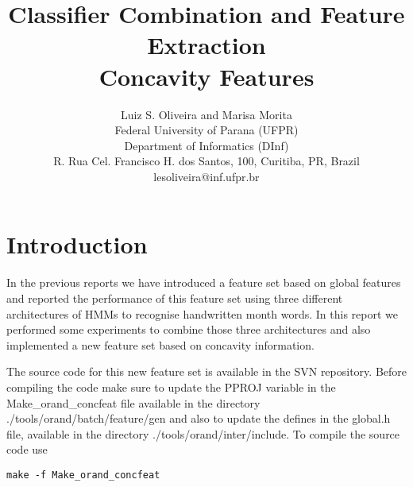 \documentclass{article}[14pt, oneside, a4paper, times]
\begin{document}
\title{Classifier Combination and Feature Extraction 
\\ \large Concavity Features}
\author{Luiz S. Oliveira and Marisa Morita  
\\
\vspace {-10pt}
Federal University of Parana (UFPR)\\
\vspace {-10pt}
Department of Informatics (DInf)\\
\vspace {-10pt}
R. Rua Cel. Francisco H. dos Santos, 100, Curitiba, PR, Brazil \\
lesoliveira@inf.ufpr.br \\ 
}


\date{}
\maketitle
\thispagestyle{empty}





\section{Introduction} 

In the previous reports we have introduced a feature set based on global features and reported the performance of this feature set using three different architectures of HMMs to recognise handwritten month words. In this report we performed some experiments to combine those three architectures and also implemented a new feature set based on concavity information. 

The source code for this new feature set is available in the SVN repository. Before compiling the code make sure to update the \textsf{PPROJ} variable in the \textsf{Make\_orand\_concfeat} file available in the directory \textsf{./tools/orand/batch/feature/gen} and also to update the defines in the \textsf{global.h} file, available in the directory \textsf{./tools/orand/inter/include}. To compile the source code use

\begin{verbatim}
make -f Make_orand_concfeat
\end{verbatim}
\end{document}
